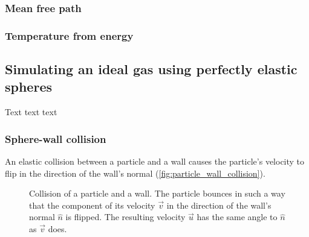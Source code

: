 \subsubsection{Mean free path}
\subsubsection{Temperature from energy}

\subsection{Simulating an ideal gas using perfectly elastic spheres}
Text text text

\subsubsection{Sphere-wall collision}
An elastic collision between a particle and a wall causes the particle's velocity to flip in the direction of the wall's normal (\autoref{fig:particle_wall_collision}).

\begin{figure}
	\begin{center}
	\end{center}
	\caption{Collision of a particle and a wall. The particle bounces in such a way that the component of its velocity $\vec{v}$ in the direction of the wall's normal $\hat{n}$ is flipped. The resulting velocity $\vec{u}$ has the same angle to $\hat{n}$ as $\vec{v}$ does.}
	\label{fig:particle_wall_collision}
\end{figure}

